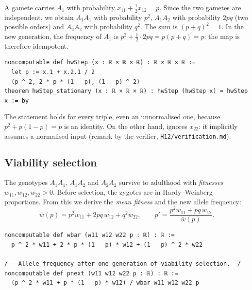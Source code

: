 \begin{humanproof}
A gamete carries $A_1$ with probability $x_{11}+\frac12x_{12}=p$. Since the two gametes are independent, we obtain
$A_1A_1$ with probability $p^2$, $A_1A_2$ with probability $2pq$ (two possible orders) and $A_2A_2$ with
probability $q^2$. The sum is $(p+q)^2=1$. In the new generation, the frequency of $A_1$ is
$p^2+\frac12\cdot2pq=p(p+q)=p$: the map is therefore idempotent.
\end{humanproof}

\begin{leanbox}
\begin{lstlisting}[language=Lean]
noncomputable def hwStep (x : ℝ × ℝ × ℝ) : ℝ × ℝ × ℝ :=
  let p := x.1 + x.2.1 / 2
  (p ^ 2, 2 * p * (1 - p), (1 - p) ^ 2)
theorem hwStep_stationary (x : ℝ × ℝ × ℝ) : hwStep (hwStep x) = hwStep x := by
\end{lstlisting}
The statement  holds for every triple, even an unnormalised one, because $p^2+p(1-p)=p$ is an identity.
On the other hand,  ignores $x_{22}$: it implicitly assumes a normalised input (remark by the
verifier, \texttt{H12/verification.md}).
\end{leanbox}

\subsection{Viability selection}
The genotypes $A_1A_1$, $A_1A_2$ and $A_2A_2$ survive to adulthood with \emph{fitnesses}
$w_{11},w_{12},w_{22}>0$. Before selection, the zygotes are in Hardy--Weinberg proportions. From this we
derive the \emph{mean fitness} and the new allele frequency:
\[
\bar w(p)=p^2w_{11}+2pq\,w_{12}+q^2w_{22},\qquad
p'=\frac{p^2w_{11}+pq\,w_{12}}{\bar w(p)}.
\]

\begin{leanbox}
\begin{lstlisting}[language=Lean]
noncomputable def wbar (w11 w12 w22 p : ℝ) : ℝ :=
  p ^ 2 * w11 + 2 * p * (1 - p) * w12 + (1 - p) ^ 2 * w22

/-- Allele frequency after one generation of viability selection. -/
noncomputable def pnext (w11 w12 w22 p : ℝ) : ℝ :=
  (p ^ 2 * w11 + p * (1 - p) * w12) / wbar w11 w12 w22 p
\end{lstlisting}
\end{leanbox}

